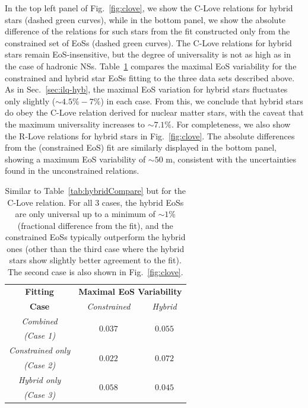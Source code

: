 \documentclass[prd,twocolumn,nofootinbib,superscriptaddress,amsmath,amssymb]{revtex4-1}
\begin{document}
In the top left panel of Fig.~\ref{fig:clove}, we show the C-Love relations for hybrid stars (dashed green curves), while in the bottom panel, we show the absolute difference of the relations for such stars from the fit constructed only from the constrained set of EoSs (dashed green curves). The C-Love relations for hybrid stars remain EoS-insensitive, but the degree of universality is not as high as in the case of hadronic NSs. Table~\ref{tab:hybridCompareClove} compares the maximal EoS variability for the constrained and hybrid star EoSs fitting to the three data sets described above. As in Sec.~\ref{sec:ilq-hyb}, the maximal EoS variation for hybrid stars fluctuates only slightly ($\sim 4.5\% - 7\%$) in each case. From this, we conclude that hybrid stars do obey the C-Love relation derived for nuclear matter stars, with the caveat that the maximum universality increases to $\sim 7.1\%$.
For completeness, we also show the R-Love relations for hybrid stars in Fig.~\ref{fig:clove}.
The absolute differences from the (constrained EoS) fit are similarly displayed in the bottom panel, showing a maximum EoS variability of $\sim50\text{ m}$, consistent with the uncertainties found in the unconstrained relations.

\begin{table}
\centering
\begin{tabular}{ c  || c c } 
 \hline
 \hline
 \textbf{Fitting} & \multicolumn{2}{c}{\textbf{Maximal EoS Variability}} \\
 \cline{2-3}
 \textbf{Case} &  \multicolumn{1}{c|}{\emph{Constrained}} & \emph{Hybrid}\\
 \hline
 \emph{Combined} &  \multirow{2}{*}{$0.037$} & \multirow{2}{*}{$0.055$}\\
 \emph{(Case 1)} & &\\
 \cline{1-1}
 \emph{Constrained only} & \multirow{2}{*}{$0.022$} & \multirow{2}{*}{$0.072$}\\
  \emph{(Case 2)} & &\\
  \cline{1-1}
 \emph{Hybrid only} & \multirow{2}{*}{$0.058$} & \multirow{2}{*}{$0.045$}\\
  \emph{(Case 3)} & &\\
  \cline{1-1}
\hline
\hline
\end{tabular}
\caption{
Similar to Table~\ref{tab:hybridCompare} but for the C-Love relation.
For all 3 cases, the hybrid EoSs are only universal up to a minimum of $\sim1$\% (fractional difference from the fit), and the constrained EoSs typically outperform the hybrid ones (other than the third case where the hybrid stars show slightly better agreement to the fit). The second case is also shown in Fig.~\ref{fig:clove}.
}\label{tab:hybridCompareClove}
\end{table}
\end{document}
